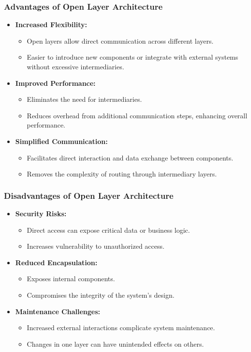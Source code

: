 \documentclass[aspectratio=169, table]{beamer}
\begin{document}
\begin{frame}
	\frametitle{Advantages of Open Layer Architecture}
	\begin{itemize}
		\item \textbf{Increased Flexibility:}
		\begin{itemize}
			\item Open layers allow direct communication across different layers.
			\item Easier to introduce new components or integrate with external systems without excessive intermediaries.
		\end{itemize}
		\item \textbf{Improved Performance:}
		\begin{itemize}
			\item Eliminates the need for intermediaries.
			\item Reduces overhead from additional communication steps, enhancing overall performance.
		\end{itemize}
		\item \textbf{Simplified Communication:}
		\begin{itemize}
			\item Facilitates direct interaction and data exchange between components.
			\item Removes the complexity of routing through intermediary layers.
		\end{itemize}
	\end{itemize}
\end{frame}

\begin{frame}
	\frametitle{Disadvantages of Open Layer Architecture}
	\begin{itemize}
		\item \textbf{Security Risks:}
		\begin{itemize}
			\item Direct access can expose critical data or business logic.
			\item Increases vulnerability to unauthorized access.
		\end{itemize}
		\item \textbf{Reduced Encapsulation:}
		\begin{itemize}
			\item Exposes internal components.
			\item Compromises the integrity of the system’s design.
		\end{itemize}
		\item \textbf{Maintenance Challenges:}
		\begin{itemize}
			\item Increased external interactions complicate system maintenance.
			\item Changes in one layer can have unintended effects on others.
		\end{itemize}
	\end{itemize}
\end{frame}
\end{document}
